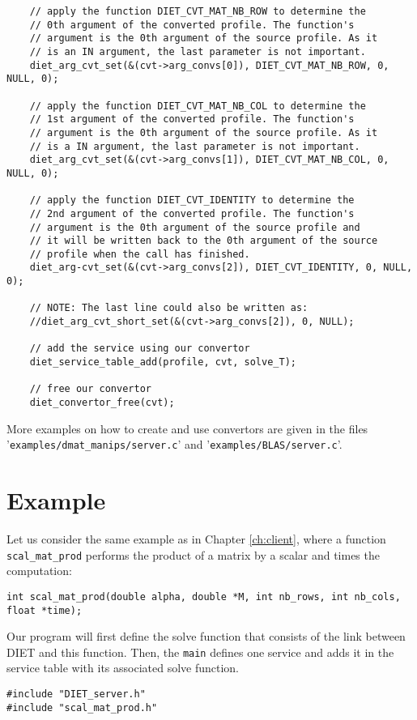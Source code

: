 {{\begin{verbatim}
    // apply the function DIET_CVT_MAT_NB_ROW to determine the
    // 0th argument of the converted profile. The function's
    // argument is the 0th argument of the source profile. As it
    // is an IN argument, the last parameter is not important.
    diet_arg_cvt_set(&(cvt->arg_convs[0]), DIET_CVT_MAT_NB_ROW, 0, NULL, 0);

    // apply the function DIET_CVT_MAT_NB_COL to determine the
    // 1st argument of the converted profile. The function's
    // argument is the 0th argument of the source profile. As it
    // is a IN argument, the last parameter is not important.
    diet_arg_cvt_set(&(cvt->arg_convs[1]), DIET_CVT_MAT_NB_COL, 0, NULL, 0);

    // apply the function DIET_CVT_IDENTITY to determine the
    // 2nd argument of the converted profile. The function's
    // argument is the 0th argument of the source profile and
    // it will be written back to the 0th argument of the source
    // profile when the call has finished.
    diet_arg-cvt_set(&(cvt->arg_convs[2]), DIET_CVT_IDENTITY, 0, NULL, 0);

    // NOTE: The last line could also be written as:
    //diet_arg_cvt_short_set(&(cvt->arg_convs[2]), 0, NULL);

    // add the service using our convertor
    diet_service_table_add(profile, cvt, solve_T);

    // free our convertor
    diet_convertor_free(cvt);
\end{verbatim}
\normalsize

\noindent More examples on how to create and use convertors are given in the
files \\
'\texttt{examples/dmat\_manips/server.c}' and '\texttt{examples/BLAS/server.c}'.


\section{Example}
\label{sec:sv_ex}

Let us consider the same example as in Chapter \ref{ch:client}, where
a function \texttt{scal\_mat\_prod} performs the product of a matrix
by a scalar and times the computation: {\footnotesize
\begin{verbatim}
int scal_mat_prod(double alpha, double *M, int nb_rows, int nb_cols, float *time);
\end{verbatim}
}
Our program will first define the solve function that consists of the link
between DIET and this function. Then, the \texttt{main} defines one service and
adds it in the service table with its associated solve function.
{\footnotesize
\begin{verbatim}
#include "DIET_server.h"
#include "scal_mat_prod.h"


\end{verbatim}}}}
